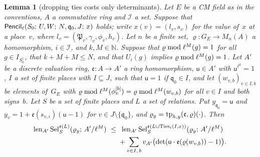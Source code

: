 \documentclass[11pt,a4paper]{article}
\newcommand{\len}{\operatorname{len}}
\newcommand{\m}[1]{\mbox{$#1$}}        %
\theoremstyle{plainx}
\newtheorem{lemma}[theorem]{Lemma}
\theoremstyle{uprightx}
\newcommand{\NN}{\mathbb{N}}
\newcommand{\GE}[1]{G_{#1}}
\newcommand{\Sel}[4]{\operatorname{Sel}_{#2}^{#3}(#1;\,#4)}
\newcommand{\inab}[1]{I_{#1}}
\newcommand{\fP}{\mathfrak{P}}
\newcommand{\fq}{\mathfrak{q}}
\begin{document}
\begin{lemma}[dropping ties costs only determinants]\label{l:drop}
Let $E$ be a CM field as in the conventions, $A$ a commutative ring and $\mathcal{I}$ a set. Suppose that
\m{\IsPencil{\ell}{S_0}{U}{W}{N}{\fq_0}{J}{x}} holds; write \m{x(v)=(l_v,s_v)} for the value of~$x$ at a place~$v$,
where \m{l_v=(\fP_v,\gamma_v,\phi_v,h_v)}. Let $n$ be a finite set, \m{\varrho\colon\GE{E}\to M_n(A)} a
homomorphism, \m{i\in\mathcal{I}}, and \m{k,M\in\NN}. Suppose that
\m{\reduceModPow{\ell}{M}{\varrho}(g)=1} for all \m{g\in\inab{S_0^{\complement}}}, that \m{k+M+M\le N}, and that
\m{U_i(g)} implies \m{\reduceModPow{\ell}{M}{\varrho}(g)=1}. Let $A'$ be a discrete valuation ring, \m{\mathfrak{e}\colon A\to A'}
a ring homomorphism, \m{\mathsf{u}\in A'} with \m{\mathsf{u}^{\ell^{k}}=1}, $I$ a set of finite places with \m{I\subseteq J}, such that
\m{\mathsf{u}=1} if \m{\fq_0\in I}, and let \m{(w_{v,b})_{v\in I,b}} be elements of~\m{\GE{E}} with
\m{\reduceModPow{\ell}{M}{\varrho}(\phi_v^{[b]})=\reduceModPow{\ell}{M}{\varrho}(w_{v,b})} for all \m{v\in I} and both
signs~$b$. Let $S$ be a set of finite places and $L$ a set of relations. Put \m{y_{\fq_0}=\mathsf{u}} and
\m{y_v=1+\mathfrak{e}(s_{v,i})(\mathsf{u}-1)} for \m{v\in J\setminus\{\fq_0\}}, and
\m{\varrho_y=\twistAtPoint{h}{y}{\mathfrak{e}}{\varrho}{\cdot}}. Then
\begin{align*}
\len_{A'}\Sel{\varrho_y}{S}{\mathfrak{e}(L)}{A'/\ell^{M}}\ \le{}&\ \len_{A'}\Sel{\varrho_y}{S}{\mathfrak{e}(L\cup\tieRelations{I}{x}{i})}{A'/\ell^{M}}\\
&+\sum_{v\in I,\,b}v_{A'}\bigl(\det(\mathsf{u}\cdot \mathfrak{e}(\varrho(w_{v,b}))-1)\bigr).
\end{align*}
\end{lemma}
\end{document}
